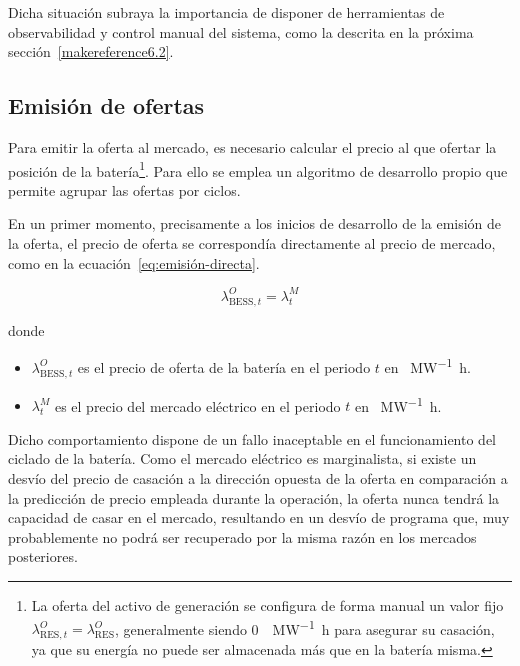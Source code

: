 Dicha situación subraya la importancia de disponer de herramientas de observabilidad y control manual del sistema, como la descrita en la próxima sección~\ref{makereference6.2}.

\subsection{Emisión de ofertas}
\label{makereference6.1.2}

Para emitir la oferta al mercado, es necesario calcular el precio al que ofertar la posición de la batería\footnote{La oferta del activo de generación se configura de forma manual un valor fijo \( \lambda^{O}_{\text{RES}, t} = \lambda^{O}_{\text{RES}} \), generalmente siendo \SI{0}{\text{\euro}\per\mega\watt\hour} para asegurar su casación, ya que su energía no puede ser almacenada más que en la batería misma.}. Para ello se emplea un algoritmo de desarrollo propio que permite agrupar las ofertas por ciclos.

  En un primer momento, precisamente a los inicios de desarrollo de la emisión de la oferta, el precio de oferta se correspondía directamente al precio de mercado, como en la ecuación~\ref{eq:emisión-directa}.

  \begin{samepage}

    \begin{equation}
      \label{eq:emisión-directa}
      \lambda^{O}_{\text{BESS}, t} = \lambda^{M}_{t}
    \end{equation}

    donde

    \begin{itemize}

      \item \( \lambda^{O}_{\text{BESS}, t} \) es el precio de oferta de la batería en el periodo \( t \) en \si{\text{\euro}\per\mega\watt\hour}.

      \item \( \lambda^{M}_{t} \) es el precio del mercado eléctrico en el periodo \( t \) en \si{\text{\euro}\per\mega\watt\hour}.

    \end{itemize}

  \end{samepage}

  Dicho comportamiento dispone de un fallo inaceptable en el funcionamiento del ciclado de la batería. Como el mercado eléctrico es marginalista, si existe un desvío del precio de casación a la dirección opuesta de la oferta en comparación a la predicción de precio empleada durante la operación, la oferta nunca tendrá la capacidad de casar en el mercado, resultando en un desvío de programa que, muy probablemente no podrá ser recuperado por la misma razón en los mercados posteriores.

